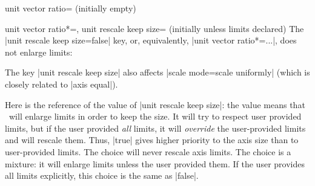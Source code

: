 \begin{pgfplotskey}{unit vector ratio= (initially empty)}
\begin{pgfplotskeylist}{%
		unit vector ratio*=,
		unit rescale keep size= (initially unless limits declared)}
	The |unit rescale keep size=false| key, or, equivalently, |unit vector ratio*=...|, does not enlarge limits:
\begin{codeexample}[]
\end{codeexample}
	The key |unit rescale keep size| also affects |scale mode=scale uniformly| (which is closely related to |axis equal|).

	Here is the reference of the value of |unit rescale keep size|: the value  means that \PGFPlots\ will enlarge limits in order to keep the size. It will try to respect user provided limits, but if the user provided \emph{all} limits, it will \emph{override} the user-provided limits and will rescale them. Thus, |true| gives higher priority to the axis size than to user-provided limits. The choice  will never rescale axis limits. The choice  is a mixture: it will enlarge limits unless the user provided them. If the user provides all limits explicitly, this choice is the same as |false|.
	\end{pgfplotskeylist}
\end{pgfplotskey}

